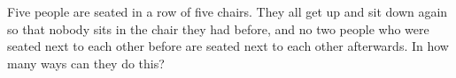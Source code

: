Five people are seated in a row of five chairs. They all get up and sit down again so that nobody sits in the chair they had before, and no two people who were seated next to each other before are seated next to each other afterwards. In how many ways can they do this?
